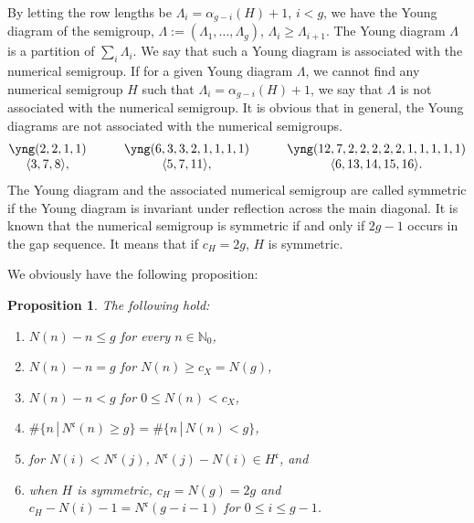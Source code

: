 \documentclass[pdftex]{sigma}
\def\NN{{\mathbb N}}
\def\fc{{\mathfrak c}}
\numberwithin{equation}{section}
\newtheorem{Proposition}[Theorem]{Proposition}
 { \theoremstyle{definition}
\newtheorem{Definition}[Theorem]{Definition}
\newtheorem{Note}[Theorem]{Note}
\newtheorem{Example}[Theorem]{Example}
\newtheorem{Remark}[Theorem]{Remark} }
\begin{document}
By letting the row lengths be $\Lambda_i = \alpha_{g-i}(H)+1$, $i< g$, we have the Young diagram of the semigroup, $\Lambda:=(\Lambda_1, \dots, \Lambda_g)$, $\Lambda_i \ge \Lambda_{i+1}$.
The Young diagram $\Lambda$ is a partition of $\sum_i\Lambda_i$.
We say that such a Young diagram is associated with the numerical semigroup.
If for a given Young diagram $\Lambda$, we cannot find any numerical semigroup $H$ such that $\Lambda_i = \alpha_{g-i}(H)+1$, we say that $\Lambda$ is not associated with the numerical semigroup.
It is obvious that in general, the Young diagrams are not associated with the numerical semigroups.
\begin{gather*}
\begin{matrix}
\yng(2,2,1,1)\qquad &
\yng(6,3,3,2,1,1,1,1)\qquad &
\yng(12,7,2,2,2,2,2,1,1,1,1,1)
\\
 \langle3, 7, 8\rangle, \qquad &
 \langle5,7,11\rangle, \qquad
 &\langle6,13,14,15,16\rangle.\\
\end{matrix}%
\end{gather*}
The Young diagram and the associated numerical semigroup are called symmetric if the Young diagram is invariant under reflection across the main diagonal.
It is known that the numerical semigroup is symmetric if and only if $2g-1$ occurs in the gap sequence.
It means that if $c_H=2g$, $H$ is symmetric.

We obviously have the following proposition:
\begin{Proposition}\label{2pr:N(n)}
The following hold:
\begin{enumerate}\itemsep=0pt
\item[$(1)$] $N(n) - n \le g$ for every $n\in \NN_0$,

\item[$(2)$]
$N(n) - n = g$ for $N(n)\ge c_X=N(g)$,

\item[$(3)$] $N(n) - n < g$ for $0\le N(n)< c_X$,

\item[$(4)$]
$\#\{n \, |\, N^\fc(n) \ge g\}=\#\{n \, |\, N(n) < g\}$,

\item[$(5)$] for $N(i) < N^\fc(j)$, $N^\fc(j)-N(i)\in H^\fc$, and

\item[$(6)$] when $H$ is symmetric, $c_H=N(g)=2g$ and
$c_H - N(i)-1=N^\fc(g-i-1)$ for $0\le i\le g-1$.
\end{enumerate}
\end{Proposition}
\end{document}
